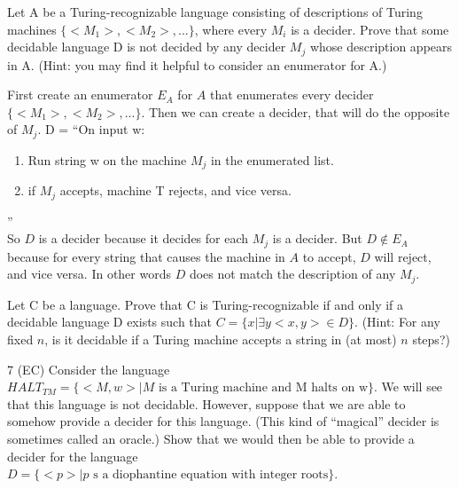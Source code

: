 \begin{problem}{5}
  Let A be a Turing-recognizable language consisting of descriptions of Turing machines $\{<M_1>, <M_2>,...\}$, where
  every $M_i$ is a decider. Prove that some decidable language D is not decided by any decider $M_j$ whose description
  appears in A. (Hint: you may find it helpful to consider an enumerator for A.)
  \begin{solution}
    First create an enumerator $E_A$ for $A$ that enumerates every decider $\{<M_1>, <M_2>,...\}$.
    \br
    Then we can create a decider, that will do the opposite of $M_j$.
    D = ``On input w:
    \begin{enumerate}
      \item Run string w on the machine $M_j$ in the enumerated list.\\
      \item if $M_j$ accepts, machine T rejects, and vice versa.\\
    \end{enumerate}
    ''\\ So $D$ is a decider because it decides for each $M_j$ is a decider.  But $D \notin E_A$ because for every
    string that causes the machine in $A$ to accept, $D$ will reject, and vice versa. In other words $D$ does not match
    the description of any $M_j$.
  \end{solution}
\end{problem}

\begin{problem}{6}
  Let C be a language. Prove that C is Turing-recognizable if and only if a decidable language D exists such that $C =
  \{x | \exists y <x,y> \in D\}$. (Hint: For any fixed $n$, is it decidable if a Turing machine accepts a string in (at
  most) $n$ steps?)
\end{problem}

\begin{problem}{7 (EC)}
  Consider the language $HALT_{TM} = \{<M,w> | M \text{ is a Turing machine and M halts on w} \}$. We will see that this
  language is not decidable. However, suppose that we are able to somehow provide a decider for this language. (This
  kind of ``magical'' decider is sometimes called an oracle.) Show that we would then be able to provide a decider for
  the language $D = \{<p> | p \text{ s a diophantine equation with integer roots}\}$.
\end{problem}


